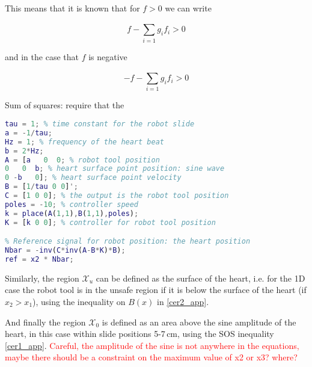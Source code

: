 This means that it is known that for $f>0$ we can write

\begin{equation}
f - \sum\limits_{i=1}^{}g_i f_i >0
\end{equation}

and in the case that $f$ is negative

\begin{equation}
-f - \sum\limits_{i=1}^{}g_i f_i >0
\end{equation}


Sum of squares: require that the 

\begin{lstlisting}[language=matlab]
% Define state-space system with x1 = robot position, x2 = heart position, x3 = heart velocity
tau = 1; % time constant for the robot slide
a = -1/tau;
Hz = 1; % frequency of the heart beat
b = 2*Hz;
A = [a   0  0; % robot tool position
0   0  b; % heart surface point position: sine wave
0 -b   0]; % heart surface point velocity
B = [1/tau 0 0]';
C = [1 0 0]; % the output is the robot tool position
poles = -10; % controller speed
k = place(A(1,1),B(1,1),poles);
K = [k 0 0]; % controller for robot tool position

% Reference signal for robot position: the heart position
Nbar = -inv(C*inv(A-B*K)*B);
ref = x2 * Nbar;
\end{lstlisting}

Similarly, the region $\mathcal{X}_u$ can be defined as the surface of the heart, i.e. for the 1D case the robot tool is in the unsafe region if it is below the surface of the heart (if $x_2>x_1$), using the inequality on $B(x)$ in \autoref{cer2_app}.

And finally the region $\mathcal{X}_0$ is defined as an area above the sine amplitude of the heart, in this case within slide positions 5-7\,cm, using the SOS inequality \autoref{cer1_app}. 
\textcolor{red}{Careful, the amplitude of the sine is not anywhere in the equations, maybe there should be a constraint on the maximum value of x2 or x3? where?}